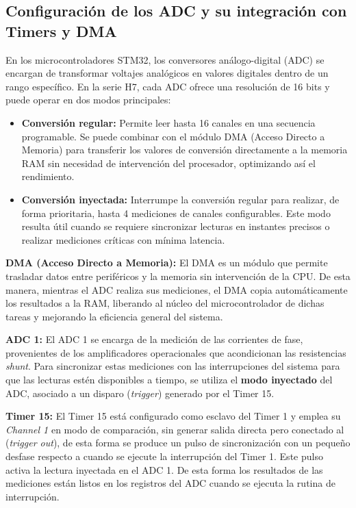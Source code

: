 \documentclass[11pt]{report}
\begin{document}
\subsection{Configuración de los ADC y su integración con Timers y DMA} En los microcontroladores STM32, los conversores análogo-digital (ADC) se encargan de transformar voltajes analógicos en valores digitales dentro de un rango específico. En la serie H7, cada ADC ofrece una resolución de 16 bits y puede operar en dos modos principales:

\begin{itemize}
	\item \textbf{Conversión regular:} Permite leer hasta 16 canales en una secuencia programable. Se puede combinar con el módulo DMA (Acceso Directo a Memoria) para transferir los valores de conversión directamente a la memoria RAM sin necesidad de intervención del procesador, optimizando así el rendimiento.
	\item \textbf{Conversión inyectada:} Interrumpe la conversión regular para realizar, de forma prioritaria, hasta 4 mediciones de canales configurables. Este modo resulta útil cuando se requiere sincronizar lecturas en instantes precisos o realizar mediciones críticas con mínima latencia.
\end{itemize}

\textbf{DMA (Acceso Directo a Memoria):} El DMA es un módulo que permite trasladar datos entre periféricos y la memoria sin intervención de la CPU. De esta manera, mientras el ADC realiza sus mediciones, el DMA copia automáticamente los resultados a la RAM, liberando al núcleo del microcontrolador de dichas tareas y mejorando la eficiencia general del sistema.

\textbf{ADC 1:} El ADC 1 se encarga de la medición de las corrientes de fase, provenientes de los amplificadores operacionales que acondicionan las resistencias \emph{shunt}. Para sincronizar estas mediciones con las interrupciones del sistema  para que las lecturas estén disponibles a tiempo, se utiliza el \textbf{modo inyectado} del ADC, asociado a un disparo (\emph{trigger}) generado por el Timer 15.

\textbf{Timer 15:} El Timer 15 está configurado como esclavo del Timer 1 y emplea su \emph{Channel 1} en modo de comparación, sin generar salida directa pero conectado al (\emph{trigger out}), de esta forma se produce un pulso de sincronización con un pequeño desfase respecto a cuando se ejecute la interrupción del Timer 1. Este pulso activa la lectura inyectada en el ADC 1. De esta forma los resultados de las mediciones están listos en los registros del ADC cuando se ejecuta la rutina de interrupción.
\end{document}
